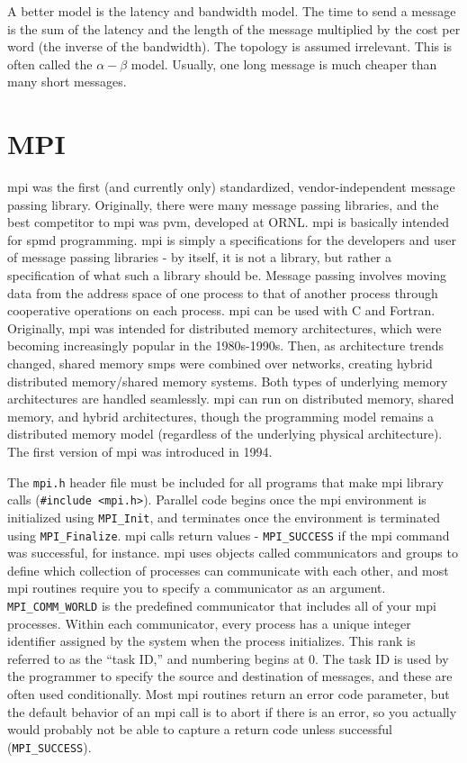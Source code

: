 \documentclass[10pt]{article}
\begin{document}
\begin{flushleft}
A better model is the latency and bandwidth model. The time to send a message is the sum of the latency and the length of the message multiplied by the cost per word (the inverse of the bandwidth). The topology is assumed irrelevant. This is often called the \(\alpha-\beta\) model. Usually, one long message is much cheaper than many short messages. 

\section{MPI}

\gls{mpi} was the first (and currently only) standardized, vendor-independent message passing library. Originally, there were many message passing libraries, and the best competitor to \gls{mpi} was \gls{pvm}, developed at ORNL. \gls{mpi} is basically intended for \gls{spmd} programming. \gls{mpi} is simply a specifications for the developers and user of message passing libraries - by itself, it is not a library, but rather a specification of what such a library should be. Message passing involves moving data from the address space of one process to that of another process through cooperative operations on each process. \gls{mpi} can be used with C and Fortran. Originally, \gls{mpi} was intended for distributed memory architectures, which were becoming increasingly popular in the 1980s-1990s. Then, as architecture trends changed, shared memory \gls{smp}s were combined over networks, creating hybrid distributed memory/shared memory systems. Both types of underlying memory architectures are handled seamlessly. \gls{mpi} can run on distributed memory, shared memory, and hybrid architectures, though the programming model remains a distributed memory model (regardless of the underlying physical architecture). The first version of \gls{mpi} was introduced in 1994. 

The {\tt mpi.h} header file must be included for all programs that make \gls{mpi} library calls ({\tt \#include <mpi.h>}). Parallel code begins once the \gls{mpi} environment is initialized using {\tt MPI\_Init}, and terminates once the environment is terminated using {\tt MPI\_Finalize}. \gls{mpi} calls return values - {\tt MPI\_SUCCESS} if the \gls{mpi} command was successful, for instance. \gls{mpi} uses objects called communicators and groups to define which collection of processes can communicate with each other, and most \gls{mpi} routines require you to specify a communicator as an argument. {\tt MPI\_COMM\_WORLD} is the predefined communicator that includes all of your \gls{mpi} processes. Within each communicator, every process has a unique integer identifier assigned by the system when the process initializes. This rank is referred to as the ``task ID,'' and numbering begins at 0. The task ID is used by the programmer to specify the source and destination of messages, and these are often used conditionally. Most \gls{mpi} routines return an error code parameter, but the default behavior of an \gls{mpi} call is to abort if there is an error, so you actually would probably not be able to capture a return code unless successful ({\tt MPI\_SUCCESS}). 


\end{flushleft}
\end{document}

